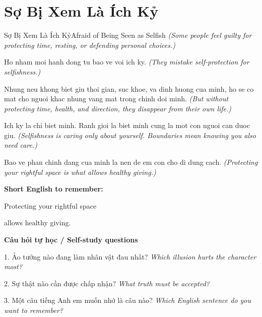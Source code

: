 \section{Sợ Bị Xem Là Ích Kỷ}
\begin{truyen}{Sợ Bị Xem Là Ích Kỷ}{Afraid of Being Seen as Selfish}
\textit{(Some people feel guilty for protecting time, resting, or defending personal choices.)}

Ho nham moi hanh dong tu bao ve voi ich ky.
\textit{(They mistake self-protection for selfishness.)}

Nhung neu khong biet giu thoi gian, suc khoe, va dinh huong cua minh, ho se co mat cho nguoi khac nhung vang mat trong chinh doi minh.
\textit{(But without protecting time, health, and direction, they disappear from their own life.)}

Ich ky la chi biet minh. Ranh gioi la biet minh cung la mot con nguoi can duoc giu.
\textit{(Selfishness is caring only about yourself. Boundaries mean knowing you also need care.)}

\end{truyen}

\begin{baihoc}
Bao ve phan chinh dang cua minh la nen de em con cho di dung cach.
\textit{(Protecting your rightful space is what allows healthy giving.)}
\end{baihoc}

\begin{ghinhoanh}
\textbf{Short English to remember:}

Protecting your rightful space

allows healthy giving.

\end{ghinhoanh}

\begin{tuhocnhanh}
\textbf{Câu hỏi tự học / Self-study questions}

1. Ảo tưởng nào đang làm nhân vật đau nhất? \textit{Which illusion hurts the character most?}

2. Sự thật nào cần được chấp nhận? \textit{What truth must be accepted?}

3. Một câu tiếng Anh em muốn nhớ là câu nào? \textit{Which English sentence do you want to remember?}
\end{tuhocnhanh}
\ngancach

